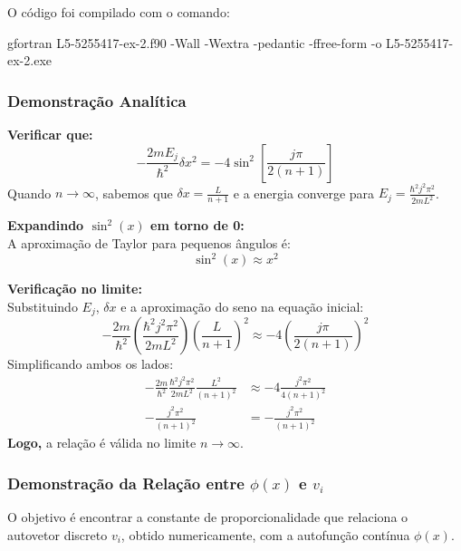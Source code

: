 \documentclass[12pt, a4paper]{article} %
\begin{document}
        O c\'odigo foi compilado com o comando:

    gfortran L5-5255417-ex-2.f90 -Wall -Wextra -pedantic -ffree-form -o L5-5255417-ex-2.exe

            \subsubsection{Demonstra\c{c}\~ao Anal\'itica}

                \textbf{Verificar que:}
                $$-\frac{2mE_j}{\hbar^2}\delta x^2 = -4\sin^2\left[\frac{j\pi}{2(n+1)}\right]$$
                Quando $n \rightarrow \infty$, sabemos que $\delta x = \frac{L}{n+1}$ e a energia converge para $E_j = \frac{\hbar^2j^2\pi^2}{2mL^2}$.

                \vspace{1em}
                \noindent
                \textbf{Expandindo $\sin^2(x)$ em torno de 0:}
                \\
                A aproximação de Taylor para pequenos ângulos é:
                $$\sin^2(x) \approx x^2$$

                \vspace{1em}
                \noindent
                \textbf{Verificação no limite:}
                \\
                Substituindo $E_j$, $\delta x$ e a aproximação do seno na equação inicial:
                $$-\frac{2m}{\hbar^2}\left(\frac{\hbar^2j^2\pi^2}{2mL^2}\right)\left(\frac{L}{n+1}\right)^2 \approx -4\left(\frac{j\pi}{2(n+1)}\right)^2$$
                Simplificando ambos os lados:
                \begin{align*}
                -\frac{2m}{\hbar^2}\frac{\hbar^2j^2\pi^2}{2mL^2}\frac{L^2}{(n+1)^2} &\approx -4\frac{j^2\pi^2}{4(n+1)^2} \\
                -\frac{j^2\pi^2}{(n+1)^2} &= -\frac{j^2\pi^2}{(n+1)^2}
                \end{align*}
                \textbf{Logo,} a relação é válida no limite $n \rightarrow \infty$.

            \subsubsection{Demonstração da Relação entre $\phi(x)$ e $v_i$}

                O objetivo é encontrar a constante de proporcionalidade que relaciona o autovetor discreto $v_i$, obtido numericamente, com a autofunção contínua $\phi(x)$.
\end{document}
